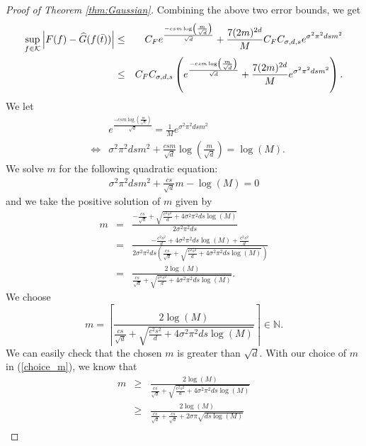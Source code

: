 \documentclass{article}
\def\NN{\mathbb N}
\numberwithin{equation}{section}
\begin{document}
\begin{appendices}
\begin{proof}[Proof of Theorem \ref{thm:Gaussian}]
Combining the above two error bounds, we get
 \begin{eqnarray*}
       \sup_{f\in \mathcal{K}}\left| F(f) - \widehat{G}(f(\Bar{t}))\right|& \leq& C_F e^{\frac{-csm\log \left(\frac{m}{\sqrt{d}}\right)}{\sqrt{d}}} + \frac{7(2m)^{2d}}{M} C_FC_{\sigma,d,s}e^{\sigma^2\pi^2 dsm^2}\\
       & \leq&  C_F C_{\sigma,d,s} \left(e^{\frac{-csm\log \left(\frac{m}{\sqrt{d}}\right)}{\sqrt{d}}} + \frac{7(2m)^{2d}}{M} e^{\sigma^2\pi^2 dsm^2}\right).
   \end{eqnarray*}
   We let 
   \begin{eqnarray*}
      && e^{\frac{-csm\log \left(\frac{m}{\sqrt{d}}\right)}{\sqrt{d}}} = \frac{1}{M}e^{\sigma^2\pi^2 dsm^2} \\
    &\iff& \sigma^2\pi^2 dsm^2 + \frac{csm}{\sqrt{d}}\log \left(\frac{m}{\sqrt{d}}\right) = \log (M).
   \end{eqnarray*}
We solve $m$ for the following quadratic equation:
\begin{eqnarray*}
    \sigma^2\pi^2 dsm^2 + \frac{cs}{\sqrt{d}}m- \log (M) = 0
\end{eqnarray*}
and we take the positive solution of $m$ given by 
\begin{eqnarray*}
    m &=& \frac{-\frac{cs}{\sqrt{d}} + \sqrt{\frac{c^2s^2}{d}+4\sigma^2\pi^2ds \log(M)}}{2\sigma^2\pi^2ds}\\
    &=& \frac{- {\frac{c^2s^2}{d}+4\sigma^2\pi^2 ds \log(M) + \frac{c^2s^2}{d}}}{2\sigma^2\pi^2ds\left(\frac{cs}{\sqrt{d}} + \sqrt{\frac{c^2s^2}{d}+4\sigma^2\pi^2ds \log(M)}\right)}\\
    &=& \frac{2 \log(M)}{\frac{cs}{\sqrt{d}} + \sqrt{\frac{c^2s^2}{d}+4\sigma^2\pi^2ds \log(M)}}.
\end{eqnarray*}
    We choose 
    \begin{equation}\label{choice_m}
        m = \left\lceil \frac{2 \log(M)}{\frac{cs}{\sqrt{d}} + \sqrt{\frac{c^2s^2}{d}+4\sigma^2\pi^2ds \log(M)}} \right \rceil \in \NN. 
    \end{equation}
    We can easily check that the chosen $m$ is greater than $\sqrt{d}$. 
    With our choice of $m$ in (\ref{choice_m}), we know that 
    \begin{eqnarray}\label{lower_m}
        m &\geq& \frac{2 \log(M)}{\frac{cs}{\sqrt{d}} + \sqrt{\frac{c^2s^2}{d}+4\sigma^2\pi^2ds \log(M)}}\nonumber\\
        &\geq& \frac{2 \log(M)}{\frac{cs}{\sqrt{d}} + \frac{cs}{\sqrt{d}}+ 2\sigma \pi \sqrt{ds \log(M)}}\nonumber\\

\end{eqnarray}
\end{proof}
\end{appendices}
\end{document}
